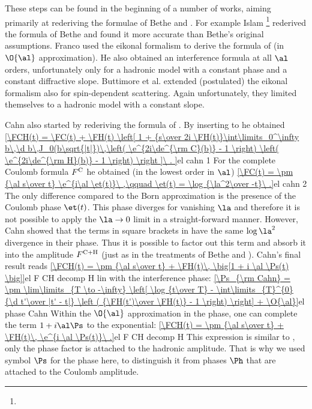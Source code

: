 These steps can be found in the beginning of a number of works, aiming primarily at rederiving the formulae of Bethe  and \WY{} .
  For example Islam \footnote{%
} rederived the formula of Bethe and found it more accurate than Bethe's original assumptions.
  Franco  used the eikonal formalism to derive the formula of \WY{} (in $\O{\al}$ approximation). He also obtained an interference formula at all $\al$ orders, unfortunately only for a hadronic model with a constant phase and a constant diffractive slope.
  Buttimore et al.  extended (postulated) the eikonal formalism also for spin-dependent scattering. Again unfortunately, they limited themselves to a hadronic model with a constant slope.

Cahn  also started by rederiving the formula of \WY. By inserting  to  he obtained
\eqref{\FCH(t) = \FC(t)
+ \FH(t) \left[ 1 +
{s\over 2i \FH(t)}\int\limits_0^\infty b\,\d b\,J_0(b\sqrt{|t|})\,\left( \e^{2i\de^{\rm C}(b)} - 1 \right) \left( \e^{2i\de^{\rm H}(b)} - 1 \right)
\right ]\ .
}{el cahn 1}
For the complete Coulomb formula $F^{\rm C}$ he obtained (in the lowest order in $\al$)
\eqref{\FC(t) = \pm {\al s\over t} \e^{i\al \et(t)}\ ,\qquad \et(t) = \log {\la^2\over -t}\ .}{el cahn 2}
The only difference compared to the Born approximation  is the presence of the Coulomb phase $\et(t)$. This phase diverges for vanishing $\la$ and therefore it is not possible to apply the $\la\to 0$ limit in a straight-forward manner. However, Cahn showed that the terms in square brackets in  have the same $\log\la^2$ divergence in their phase. Thus it is possible to factor out this term and absorb it into the amplitude $F^{\rm C+H}$ (just as in the treatments of Bethe and \WY). Cahn's final result reads
\eqref{\FCH(t) = \pm {\al s\over t} + \FH(t)\, \big[1 + i \al \Ps(t) \big]}{el F CH decomp H lin}
with the interference phase:
\eqref{\Ps_{\rm Cahn} = \pm \lim\limits_{T \to -\infty} \left[ \log {t\over T} - \int\limits_{T}^{0} {\d t'\over |t' - t|} \left ( {\FH(t')\over \FH(t)} - 1 \right) \right] + \O{\al}}{el phase Cahn}
Within the $\O{\al}$ approximation in the phase, one can complete the term $1+i\al\Ps$ to the exponential:
\eqref{\FCH(t) = \pm {\al s\over t} + \FH(t)\, \e^{i \al \Ps(t)}\ .}{el F CH decomp H}
This expression is similar to , only the phase factor is attached to the hadronic amplitude. That is why we used symbol $\Ps$ for the phase here, to distinguish it from phases $\Ph$ that are attached to the Coulomb amplitude.

